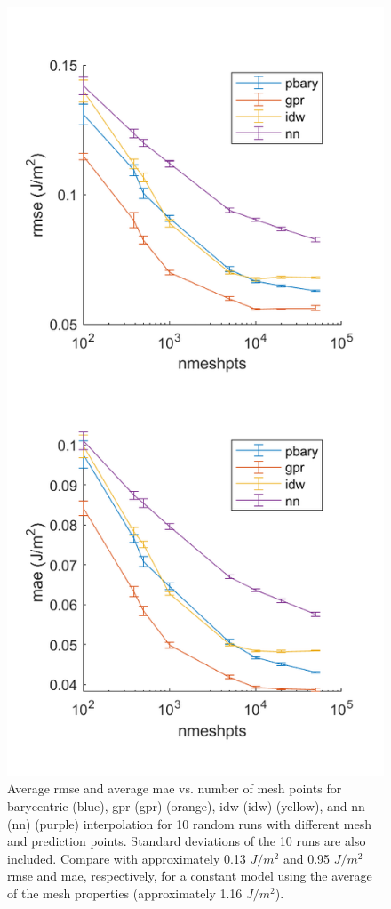 \documentclass[preprint,12pt]{elsarticle}
\begin{document}
\begin{figure}
    \centering
    \includegraphics{brkerror.png}
    \caption{Average \acrlong{rmse} and average \acrlong{mae} vs. number of mesh points for barycentric (blue), \acrlong{gpr} (\acrshort{gpr}) (orange), \acrlong{idw} (\acrshort{idw}) (yellow), and \acrlong{nn} (\acrshort{nn}) (purple) interpolation for 10 random runs with different mesh and prediction points. Standard deviations of the 10 runs are also included. Compare with approximately 0.13 $J/m^2$ and 0.95 $J/m^2$ \acrshort{rmse} and \acrshort{mae}, respectively, for a constant model using the average of the mesh properties (approximately 1.16 $J/m^2$).}
    \label{fig:brkerror}
\end{figure}
    
\end{document}
